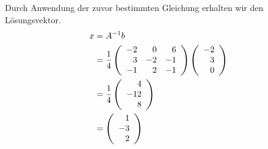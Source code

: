 \documentclass[main.tex]{subfiles}
\begin{document}
Durch Anwendung der zuvor bestimmten Gleichung erhalten wir den Lösungsvektor.
\begin{align*}
    x &= A^{-1}b\\
    &= \frac{1}{4} \eqmatrix{rrr}{
        -2 &  0 &  6 \\
         3 & -2 & -1 \\
        -1 &  2 & -1 \\
    } \eqmatrix{r}{-2 \\ 3 \\ 0}\\
    &=  \frac{1}{4} \eqmatrix{r}{
        4 \\ -12 \\ 8
    }\\
    &= \eqmatrix{r}{
        1 \\ -3 \\ 2
    }\\
\end{align*}
\end{document}
